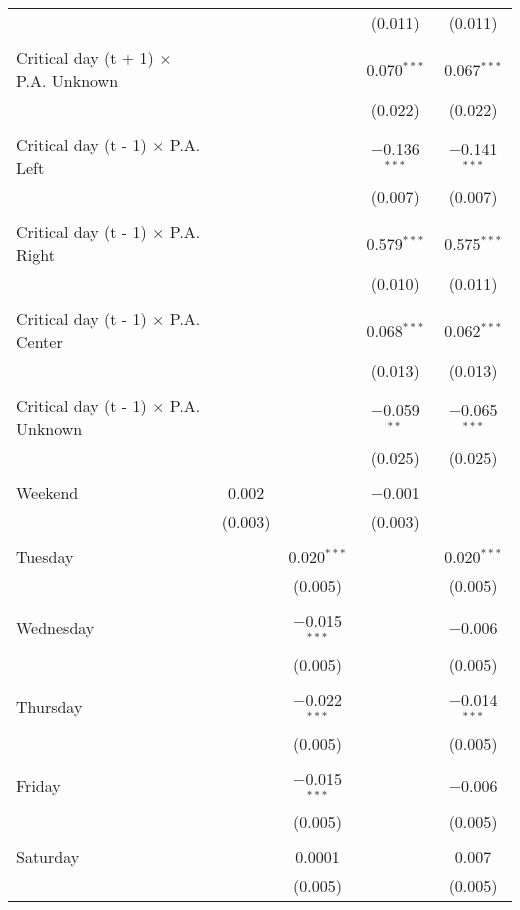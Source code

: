 \documentclass[
]{article}
\begin{document}
\begin{table}[!htbp]
{\begin{tabular}{@{\extracolsep{5pt}}lcccc}
  &  &  & (0.011) & (0.011) \\ 
  & & & & \\ 
 Critical day (t + 1) $\times$ P.A. Unknown &  &  & 0.070$^{***}$ & 0.067$^{***}$ \\ 
  &  &  & (0.022) & (0.022) \\ 
  & & & & \\ 
 Critical day (t - 1) $\times$ P.A. Left &  &  & $-$0.136$^{***}$ & $-$0.141$^{***}$ \\ 
  &  &  & (0.007) & (0.007) \\ 
  & & & & \\ 
 Critical day (t - 1) $\times$ P.A. Right &  &  & 0.579$^{***}$ & 0.575$^{***}$ \\ 
  &  &  & (0.010) & (0.011) \\ 
  & & & & \\ 
 Critical day (t - 1) $\times$ P.A. Center &  &  & 0.068$^{***}$ & 0.062$^{***}$ \\ 
  &  &  & (0.013) & (0.013) \\ 
  & & & & \\ 
 Critical day (t - 1) $\times$ P.A. Unknown &  &  & $-$0.059$^{**}$ & $-$0.065$^{***}$ \\ 
  &  &  & (0.025) & (0.025) \\ 
  & & & & \\ 
 Weekend & 0.002 &  & $-$0.001 &  \\ 
  & (0.003) &  & (0.003) &  \\ 
  & & & & \\ 
 Tuesday &  & 0.020$^{***}$ &  & 0.020$^{***}$ \\ 
  &  & (0.005) &  & (0.005) \\ 
  & & & & \\ 
 Wednesday &  & $-$0.015$^{***}$ &  & $-$0.006 \\ 
  &  & (0.005) &  & (0.005) \\ 
  & & & & \\ 
 Thursday &  & $-$0.022$^{***}$ &  & $-$0.014$^{***}$ \\ 
  &  & (0.005) &  & (0.005) \\ 
  & & & & \\ 
 Friday &  & $-$0.015$^{***}$ &  & $-$0.006 \\ 
  &  & (0.005) &  & (0.005) \\ 
  & & & & \\ 
 Saturday &  & 0.0001 &  & 0.007 \\ 
  &  & (0.005) &  & (0.005) \\ 

\end{tabular}}
\end{table}
\end{document}
